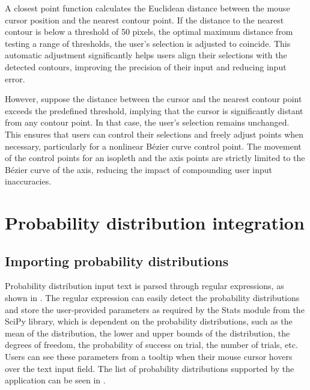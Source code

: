 \documentclass{l4proj}
\begin{document}
A closest point function calculates the Euclidean distance between the mouse cursor position and the nearest contour point. If the distance to the nearest contour is below a threshold of 50 pixels, the optimal maximum distance from testing a range of thresholds, the user's selection is adjusted to coincide. This automatic adjustment significantly helps users align their selections with the detected contours, improving the precision of their input and reducing input error. 

However, suppose the distance between the cursor and the nearest contour point exceeds the predefined threshold, implying that the cursor is significantly distant from any contour point. In that case, the user's selection remains unchanged. This ensures that users can control their selections and freely adjust points when necessary, particularly for a nonlinear Bézier curve control point. The movement of the control points for an isopleth and the axis points are strictly limited to the Bézier curve of the axis, reducing the impact of compounding user input inaccuracies.


\section{Probability distribution integration}
\subsection{Importing probability distributions}
Probability distribution input text is parsed through regular expressions, as shown in . The regular expression can easily detect the probability distributions and store the user-provided parameters as required by the Stats module from the SciPy library, which is dependent on the probability distributions, such as the mean of the distribution, the lower and upper bounds of the distribution, the degrees of freedom, the probability of success on trial, the number of trials, etc. Users can see these parameters from a tooltip when their mouse cursor hovers over the text input field. The list of probability distributions supported by the application can be seen in . 



 
\end{document}
